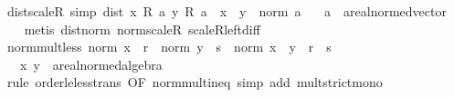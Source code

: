 \begin{isabellebody}
\ dist{\isacharunderscore}{\kern0pt}scaleR\ {\isacharbrackleft}{\kern0pt}simp{\isacharbrackright}{\kern0pt}{\isacharcolon}{\kern0pt}\ {\isachardoublequoteopen}dist\ {\isacharparenleft}{\kern0pt}x\ {\isacharasterisk}{\kern0pt}\isactrlsub R\ a{\isacharparenright}{\kern0pt}\ {\isacharparenleft}{\kern0pt}y\ {\isacharasterisk}{\kern0pt}\isactrlsub R\ a{\isacharparenright}{\kern0pt}\ {\isacharequal}{\kern0pt}\ {\isasymbar}x\ {\isacharminus}{\kern0pt}\ y{\isasymbar}\ {\isacharasterisk}{\kern0pt}\ norm\ a{\isachardoublequoteclose}\isanewline
\ \ \ a\ {\isacharcolon}{\kern0pt}{\isacharcolon}{\kern0pt}\ {\isachardoublequoteopen}{\isacharprime}{\kern0pt}a{\isacharcolon}{\kern0pt}{\isacharcolon}{\kern0pt}real{\isacharunderscore}{\kern0pt}normed{\isacharunderscore}{\kern0pt}vector{\isachardoublequoteclose}\isanewline
%
\isadelimproof
\ \ %
\endisadelimproof
%
\isatagproof
{}\isamarkupfalse%
\ {\isacharparenleft}{\kern0pt}metis\ dist{\isacharunderscore}{\kern0pt}norm\ norm{\isacharunderscore}{\kern0pt}scaleR\ scaleR{\isacharunderscore}{\kern0pt}left{\isachardot}{\kern0pt}diff{\isacharparenright}{\kern0pt}%
\endisatagproof
{\isafoldproof}%
%
\isadelimproof
\isanewline
%
\endisadelimproof
\isanewline
{}\isamarkupfalse%
\ norm{\isacharunderscore}{\kern0pt}mult{\isacharunderscore}{\kern0pt}less{\isacharcolon}{\kern0pt}\ {\isachardoublequoteopen}norm\ x\ {\isacharless}{\kern0pt}\ r\ {\isasymLongrightarrow}\ norm\ y\ {\isacharless}{\kern0pt}\ s\ {\isasymLongrightarrow}\ norm\ {\isacharparenleft}{\kern0pt}x\ {\isacharasterisk}{\kern0pt}\ y{\isacharparenright}{\kern0pt}\ {\isacharless}{\kern0pt}\ r\ {\isacharasterisk}{\kern0pt}\ s{\isachardoublequoteclose}\isanewline
\ \ \ x\ y\ {\isacharcolon}{\kern0pt}{\isacharcolon}{\kern0pt}\ {\isachardoublequoteopen}{\isacharprime}{\kern0pt}a{\isacharcolon}{\kern0pt}{\isacharcolon}{\kern0pt}real{\isacharunderscore}{\kern0pt}normed{\isacharunderscore}{\kern0pt}algebra{\isachardoublequoteclose}\isanewline
%
\isadelimproof
\ \ %
\endisadelimproof
%
\isatagproof
{}\isamarkupfalse%
\ {\isacharparenleft}{\kern0pt}rule\ order{\isacharunderscore}{\kern0pt}le{\isacharunderscore}{\kern0pt}less{\isacharunderscore}{\kern0pt}trans\ {\isacharbrackleft}{\kern0pt}OF\ norm{\isacharunderscore}{\kern0pt}mult{\isacharunderscore}{\kern0pt}ineq{\isacharbrackright}{\kern0pt}{\isacharparenright}{\kern0pt}\ {\isacharparenleft}{\kern0pt}simp\ add{\isacharcolon}{\kern0pt}\ mult{\isacharunderscore}{\kern0pt}strict{\isacharunderscore}{\kern0pt}mono{\isacharprime}{\kern0pt}{\isacharparenright}{\kern0pt}%

\end{isabellebody}
